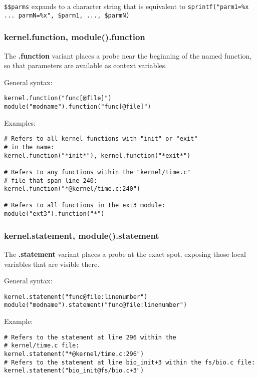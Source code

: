 \documentclass[twoside,english]{article}
\newenvironment{vindent}
{\begin{list}{}{\setlength{\listparindent}{6pt}}
\item[]}
{\end{list}}
\begin{document}
\texttt{\$\$parms} expands to a character string that is equivalent to
\texttt{sprintf("parm1=\%x ... parmN=\%x", \$parm1, ..., \$parmN)}


\subsubsection{kernel.function, module().function}
The \textbf{.function} variant places a probe near the beginning of the named function,
so that parameters are available as context variables.

General syntax:

\begin{vindent}
\begin{verbatim}
kernel.function("func[@file]")
module("modname").function("func[@file]")
\end{verbatim}
\end{vindent}
Examples:

\begin{vindent}
\begin{verbatim}
# Refers to all kernel functions with "init" or "exit"
# in the name:
kernel.function("*init*"), kernel.function("*exit*")

# Refers to any functions within the "kernel/time.c"
# file that span line 240:
kernel.function("*@kernel/time.c:240")

# Refers to all functions in the ext3 module:
module("ext3").function("*")
\end{verbatim}
\end{vindent}

\subsubsection{kernel.statement, module().statement}
The \textbf{.statement} variant places a probe at the exact spot, exposing those local
variables that are visible there.

General syntax:

\begin{vindent}
\begin{verbatim}
kernel.statement("func@file:linenumber")
module("modname").statement("func@file:linenumber")
\end{verbatim}
\end{vindent}
Example:

\begin{vindent}
\begin{verbatim}
# Refers to the statement at line 296 within the
# kernel/time.c file:
kernel.statement("*@kernel/time.c:296")
# Refers to the statement at line bio_init+3 within the fs/bio.c file:
kernel.statement("bio_init@fs/bio.c+3")
\end{verbatim}
\end{vindent}
\end{document}

